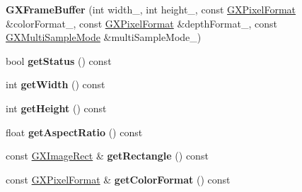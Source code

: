 \begin{DoxyCompactItemize}
\item 
{\bfseries G\+X\+Frame\+Buffer} (int width\+\_\+, int height\+\_\+, const \hyperlink{class_i_dream_sky_1_1_g_x_pixel_format}{G\+X\+Pixel\+Format} \&color\+Format\+\_\+, const \hyperlink{class_i_dream_sky_1_1_g_x_pixel_format}{G\+X\+Pixel\+Format} \&depth\+Format\+\_\+, const \hyperlink{class_i_dream_sky_1_1_g_x_multi_sample_mode}{G\+X\+Multi\+Sample\+Mode} \&multi\+Sample\+Mode\+\_\+)\hypertarget{class_i_dream_sky_1_1_g_x_frame_buffer_acb61f41cbf2d42b472297855c5e27864}{}\label{class_i_dream_sky_1_1_g_x_frame_buffer_acb61f41cbf2d42b472297855c5e27864}

\item 
bool {\bfseries get\+Status} () const \hypertarget{class_i_dream_sky_1_1_g_x_frame_buffer_ac0d60c1b4fb49ffe0f7c4f39e12761de}{}\label{class_i_dream_sky_1_1_g_x_frame_buffer_ac0d60c1b4fb49ffe0f7c4f39e12761de}

\item 
int {\bfseries get\+Width} () const \hypertarget{class_i_dream_sky_1_1_g_x_frame_buffer_a21840149b3c41272575c9bfbd2a26729}{}\label{class_i_dream_sky_1_1_g_x_frame_buffer_a21840149b3c41272575c9bfbd2a26729}

\item 
int {\bfseries get\+Height} () const \hypertarget{class_i_dream_sky_1_1_g_x_frame_buffer_a2bfffe90157333e6f22957ab31fb2ec7}{}\label{class_i_dream_sky_1_1_g_x_frame_buffer_a2bfffe90157333e6f22957ab31fb2ec7}

\item 
float {\bfseries get\+Aspect\+Ratio} () const \hypertarget{class_i_dream_sky_1_1_g_x_frame_buffer_acb651206223853b9e7f1fc8ec822026a}{}\label{class_i_dream_sky_1_1_g_x_frame_buffer_acb651206223853b9e7f1fc8ec822026a}

\item 
const \hyperlink{class_i_dream_sky_1_1_g_x_image_rect}{G\+X\+Image\+Rect} \& {\bfseries get\+Rectangle} () const \hypertarget{class_i_dream_sky_1_1_g_x_frame_buffer_ad6ad7530d98480a09f5bea5cde11f24e}{}\label{class_i_dream_sky_1_1_g_x_frame_buffer_ad6ad7530d98480a09f5bea5cde11f24e}

\item 
const \hyperlink{class_i_dream_sky_1_1_g_x_pixel_format}{G\+X\+Pixel\+Format} \& {\bfseries get\+Color\+Format} () const \hypertarget{class_i_dream_sky_1_1_g_x_frame_buffer_a4e40d145996cb4f6d30fe7b9bdc5495a}{}\label{class_i_dream_sky_1_1_g_x_frame_buffer_a4e40d145996cb4f6d30fe7b9bdc5495a}


\end{DoxyCompactItemize}

